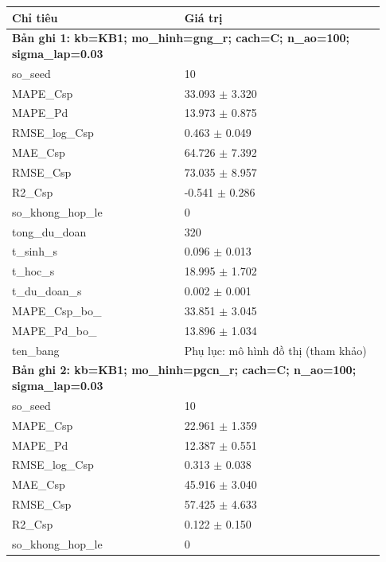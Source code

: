 \begin{longtable}{p{0.43\linewidth}p{0.50\linewidth}}
\toprule Chỉ tiêu & Giá trị \\ \midrule \endhead
\multicolumn{2}{p{0.95\linewidth}}{\textbf{Bản ghi 1: kb=KB1; mo\_hinh=gng\_r; cach=C; n\_ao=100; sigma\_lap=0.03}} \\
so\_\allowbreak seed & 10 \\
MAPE\_\allowbreak Csp & 33.093 $\pm$ 3.320 \\
MAPE\_\allowbreak Pd & 13.973 $\pm$ 0.875 \\
RMSE\_\allowbreak log\_\allowbreak Csp & 0.463 $\pm$ 0.049 \\
MAE\_\allowbreak Csp & 64.726 $\pm$ 7.392 \\
RMSE\_\allowbreak Csp & 73.035 $\pm$ 8.957 \\
R2\_\allowbreak Csp & -0.541 $\pm$ 0.286 \\
so\_\allowbreak khong\_\allowbreak hop\_\allowbreak le & 0 \\
tong\_\allowbreak du\_\allowbreak doan & 320 \\
t\_\allowbreak sinh\_\allowbreak s & 0.096 $\pm$ 0.013 \\
t\_\allowbreak hoc\_\allowbreak s & 18.995 $\pm$ 1.702 \\
t\_\allowbreak du\_\allowbreak doan\_\allowbreak s & 0.002 $\pm$ 0.001 \\
MAPE\_\allowbreak Csp\_\allowbreak bo\_\allowbreak 0075 & 33.851 $\pm$ 3.045 \\
MAPE\_\allowbreak Pd\_\allowbreak bo\_\allowbreak 0075 & 13.896 $\pm$ 1.034 \\
ten\_\allowbreak bang & Phụ lục: mô hình đồ thị (tham khảo) \\
\midrule
\multicolumn{2}{p{0.95\linewidth}}{\textbf{Bản ghi 2: kb=KB1; mo\_hinh=pgcn\_r; cach=C; n\_ao=100; sigma\_lap=0.03}} \\
so\_\allowbreak seed & 10 \\
MAPE\_\allowbreak Csp & 22.961 $\pm$ 1.359 \\
MAPE\_\allowbreak Pd & 12.387 $\pm$ 0.551 \\
RMSE\_\allowbreak log\_\allowbreak Csp & 0.313 $\pm$ 0.038 \\
MAE\_\allowbreak Csp & 45.916 $\pm$ 3.040 \\
RMSE\_\allowbreak Csp & 57.425 $\pm$ 4.633 \\
R2\_\allowbreak Csp & 0.122 $\pm$ 0.150 \\
so\_\allowbreak khong\_\allowbreak hop\_\allowbreak le & 0 \\

\end{longtable}
